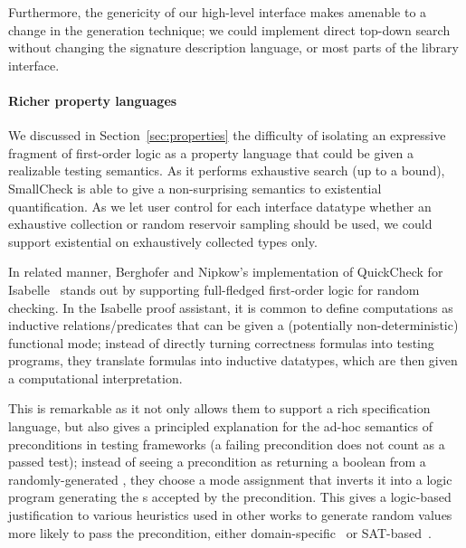 Furthermore, the genericity of our high-level interface makes
 amenable to a change in the generation technique; we
could implement direct top-down search without changing the signature
description language, or most parts of the library interface.

\paragraph{Richer property languages}

We discussed in Section~\ref{sec:properties} the difficulty of
isolating an expressive fragment of first-order logic as a property
language that could be given a realizable testing semantics. As it
performs exhaustive search (up to a bound), SmallCheck is able to give
a non-surprising semantics to existential quantification. As we let
user control for each interface datatype whether an exhaustive
collection or random reservoir sampling should be used, we could
support existential on exhaustively collected types only.

In related manner, Berghofer and Nipkow's
implementation of QuickCheck for
Isabelle~\cite{DBLP:conf/sefm/BerghoferN04} stands out by supporting full-fledged
first-order logic for random checking. In the Isabelle proof
assistant, it is common to define computations as inductive
relations/predicates that can be given a (potentially
non-deterministic) functional mode; instead of directly turning
correctness formulas into testing programs, they translate formulas
into inductive datatypes, which are then given a computational
interpretation.

This is remarkable as it not only allows them to support a rich
specification language, but also gives a principled explanation for
the ad-hoc semantics of preconditions in testing frameworks (a failing
precondition does not count as a passed test); instead of seeing
a precondition  as returning a boolean from
a randomly-generated , they choose a mode assignment that
inverts it into a logic program generating the s accepted by
the precondition. This gives a logic-based justification to various
heuristics used in other works to generate random values more likely
to pass the precondition, either
domain-specific~\cite{DBLP:conf/tap/ClaessenS08} or
SAT-based~\cite{DBLP:conf/tap/AhnD10}.
